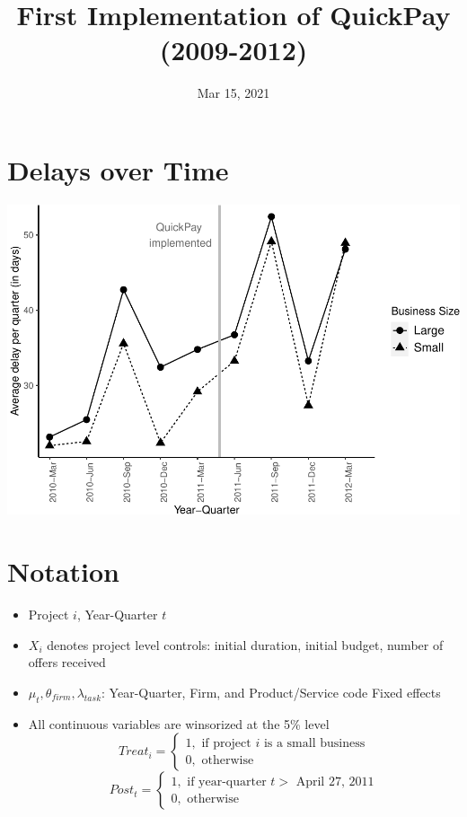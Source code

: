 \documentclass[
]{article}
\title{First Implementation of QuickPay (2009-2012)}
\author{}
\date{\vspace{-2.5em}Mar 15, 2021}
\providecommand{\tightlist}{%
  \setlength{\itemsep}{0pt}\setlength{\parskip}{0pt}}
\begin{document}
\maketitle

\hypertarget{delays-over-time}{%
\section{Delays over Time}\label{delays-over-time}}

\includegraphics{qp_first_implementation_files/figure-latex/plot-1.pdf}

\hypertarget{notation}{%
\section{Notation}\label{notation}}

\begin{itemize}
\tightlist
\item
  Project \(i\), Year-Quarter \(t\)
\item
  \(X_i\) denotes project level controls: initial duration, initial
  budget, number of offers received
\item
  \(\mu_t,\theta_{firm},\lambda_{task}\): Year-Quarter, Firm, and
  Product/Service code Fixed effects
\item
  All continuous variables are winsorized at the 5\% level
  \[ Treat_i = \begin{cases} 1, \text{ if project } i \text{ is a small business}\\
  0, \text{ otherwise} \end{cases}\]
  \[ Post_t = \begin{cases} 1, \text{ if year-quarter } t > \text{ April 27, 2011}\\
  0, \text{ otherwise} \end{cases}\]
\end{itemize}
\end{document}
